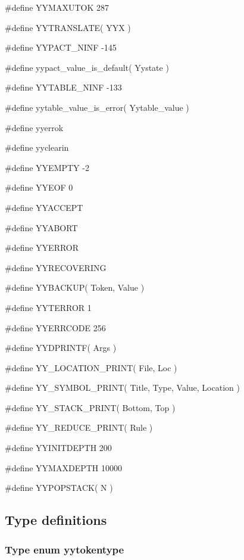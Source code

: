\medskip
{\stt \#define YYMAXUTOK 287}

\medskip
{\stt \#define YYTRANSLATE( YYX )}

\medskip
{\stt \#define YYPACT\_NINF -145}

\medskip
{\stt \#define yypact\_value\_is\_default( Yystate )}

\medskip
{\stt \#define YYTABLE\_NINF -133}

\medskip
{\stt \#define yytable\_value\_is\_error( Yytable\_value )}

\medskip
{\stt \#define yyerrok}

\medskip
{\stt \#define yyclearin}

\medskip
{\stt \#define YYEMPTY -2}

\medskip
{\stt \#define YYEOF 0}

\medskip
{\stt \#define YYACCEPT}

\medskip
{\stt \#define YYABORT}

\medskip
{\stt \#define YYERROR}

\medskip
{\stt \#define YYRECOVERING}

\medskip
{\stt \#define YYBACKUP( Token, Value )}

\medskip
{\stt \#define YYTERROR 1}

\medskip
{\stt \#define YYERRCODE 256}

\medskip
{\stt \#define YYDPRINTF( Args )}

\medskip
{\stt \#define YY\_LOCATION\_PRINT( File, Loc )}

\medskip
{\stt \#define YY\_SYMBOL\_PRINT( Title, Type, Value, Location )}

\medskip
{\stt \#define YY\_STACK\_PRINT( Bottom, Top )}

\medskip
{\stt \#define YY\_REDUCE\_PRINT( Rule )}

\medskip
{\stt \#define YYINITDEPTH 200}

\medskip
{\stt \#define YYMAXDEPTH 10000}

\medskip
{\stt \#define YYPOPSTACK( N )}


\subsection{Type definitions}


\subsubsection{Type enum yytokentype}
\label{type_enum_yytokentype_jv-exp.c}

